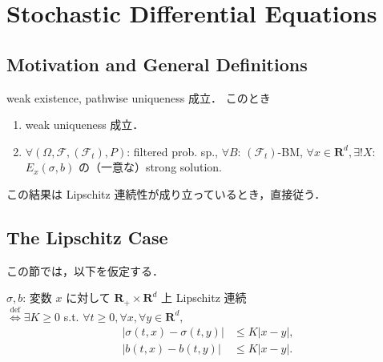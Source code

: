 \documentclass{jsarticle}
\title{}
\author{}
\date{
}
\begin{document}
\setcounter{section}{7}
\section{Stochastic Differential Equations}
\subsection{Motivation and General Definitions}

\begin{screen}
    \begin{thm*}
        weak existence, pathwise uniqueness 成立．
        このとき
        \begin{enumerate}[label=(\roman*)]
            \item
            weak uniqueness 成立．
            \item
            $\forall (\Omega, \mathcal{F}, (\mathcal{F}_t), P)$: filtered prob. sp., $\forall B$: $(\mathcal{F}_t)$-BM, $\forall x\in\mathbf{R}^d, \exists! X$: $E_x(\sigma, b)$ の（一意な）strong solution.
        \end{enumerate}
    \end{thm*}
\end{screen}

この結果は Lipschitz 連続性が成り立っているとき，直接従う．

\subsection{The Lipschitz Case}

この節では，以下を仮定する．

\begin{screen}
    \begin{df*}
    $\sigma, b$: 変数 $x$ に対して $\mathbf{R_+}\times\mathbf{R}^d$ 上 Lipschitz 連続 \\
        $\stackrel{\operatorname{def}}{\iff}\exists K\ge0$ s.t. $\forall t\ge0, \forall x, \forall y\in\mathbf{R}^d,$
        \begin{align}
            \left\lvert\sigma(t, x)-\sigma(t, y)\right\rvert
            &\le K\left\lvert x-y\right\rvert, \\
            \left\lvert b(t, x)-b(t, y)\right\rvert
            &\le K\left\lvert x-y\right\rvert.
        \end{align}
    \end{df*}
\end{screen}
\end{document}
